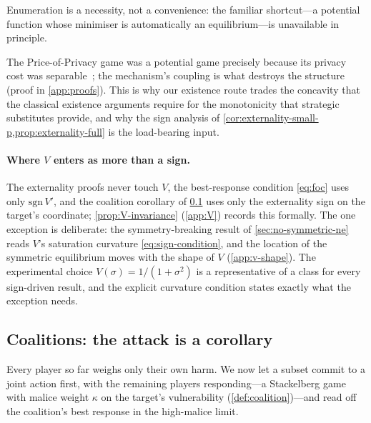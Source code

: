 Enumeration is a necessity, not a convenience: the familiar
shortcut---a potential function whose minimiser is automatically an
equilibrium---is unavailable in principle.


The Price-of-Privacy game was a potential game precisely because its
privacy cost was separable~\cite{pejo2019together}; the mechanism's
coupling is what destroys the structure (proof in \cref{app:proofs}).
This is why our existence route trades the concavity that the
classical existence arguments require for the monotonicity that
strategic substitutes provide, and why the sign analysis of
\cref{cor:externality-small-p,prop:externality-full} is the
load-bearing input.

\paragraph{Where $V$ enters as more than a sign.} The externality
proofs never touch $V$, the best-response condition \eqref{eq:foc}
uses only $\mathrm{sgn}\,V'$, and the coalition corollary of
\cref{sec:coalition} uses only the externality sign on the
target's coordinate; \cref{prop:V-invariance} (\cref{app:V})
records this formally. The one exception is deliberate: the
symmetry-breaking result of \cref{sec:no-symmetric-ne} reads $V$'s
saturation curvature \eqref{eq:sign-condition}, and the location
of the symmetric equilibrium moves with the shape of $V$
(\cref{app:v-shape}). The experimental choice $V(\sigma) =
1/(1+\sigma^2)$ is a representative of a class for every
sign-driven result, and the explicit curvature condition states
exactly what the exception needs.

\subsection{Coalitions: the attack is a corollary}
\label{sec:coalition}

Every player so far weighs only their own harm. We now let a subset
commit to a joint action first, with the remaining players
responding---a Stackelberg game with malice weight $\kappa$ on the
target's vulnerability (\cref{def:coalition})---and read off the
coalition's best response in the high-malice limit.

